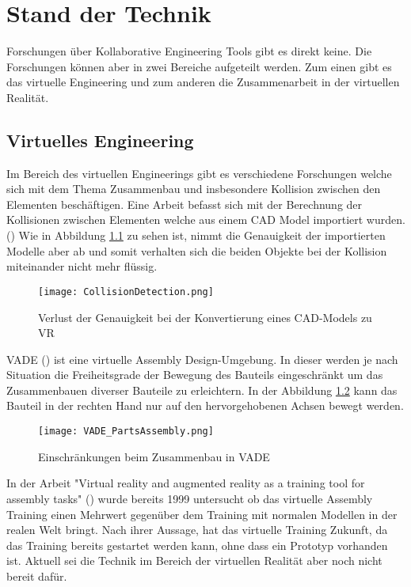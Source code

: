 \chapter{Stand der Technik}
\label{ch:StandDerTechnik}

Forschungen über Kollaborative Engineering Tools gibt es direkt keine. Die Forschungen können aber in zwei Bereiche aufgeteilt werden. Zum einen gibt es das virtuelle Engineering und zum anderen die Zusammenarbeit in der virtuellen Realität.

\section{Virtuelles Engineering}

Im Bereich des virtuellen Engineerings gibt es verschiedene Forschungen welche sich mit dem Thema Zusammenbau und insbesondere Kollision zwischen den Elementen beschäftigen.
Eine Arbeit befasst sich mit der Berechnung der Kollisionen zwischen Elementen welche aus einem CAD Model importiert wurden. (\cite{tching_interactive_2010})
Wie in Abbildung \ref{fig:LossOfAccuracy} zu sehen ist, nimmt die Genauigkeit der importierten Modelle aber ab und somit verhalten sich die beiden Objekte bei der Kollision miteinander nicht mehr flüssig.

\begin{figure}[h!]
	\centering
	\texttt{[image: CollisionDetection.png]}
	\caption{Verlust der Genauigkeit bei der Konvertierung eines CAD-Models zu VR}
	\label{fig:LossOfAccuracy}
\end{figure}

\noindent VADE (\cite{noauthor_vade:_nodate}) ist eine virtuelle Assembly Design-Umgebung. In dieser werden je nach Situation die Freiheitsgrade der Bewegung des Bauteils eingeschränkt um das Zusammenbauen diverser Bauteile zu erleichtern. 
In der Abbildung \ref{fig:VADEAssembly} kann das Bauteil in der rechten Hand nur auf den hervorgehobenen Achsen bewegt werden. \\

\begin{figure}[h!]
	\centering
	\texttt{[image: VADE\_PartsAssembly.png]}
	\caption{Einschränkungen beim Zusammenbau in VADE}
	\label{fig:VADEAssembly}
\end{figure}

\noindent In der Arbeit "Virtual reality and augmented reality as a training tool for assembly tasks" (\cite{boud_virtual_1999}) wurde bereits 1999 untersucht ob das virtuelle Assembly Training einen Mehrwert gegenüber dem Training mit normalen Modellen in der realen Welt bringt. Nach ihrer Aussage, hat das virtuelle Training Zukunft, da das Training bereits gestartet werden kann, ohne dass ein Prototyp vorhanden ist. Aktuell sei die Technik im Bereich der virtuellen Realität aber noch nicht bereit dafür. 

